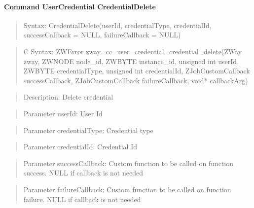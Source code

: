 \paragraph{Command UserCredential CredentialDelete}
\begin{quote}Syntax: CredentialDelete(userId, credentialType, credentialId, successCallback = NULL, failureCallback = NULL)\end{quote}
\begin{quote}C Syntax: ZWError zway\_cc\_user\_credential\_credential\_delete(ZWay zway, ZWNODE node\_id, ZWBYTE instance\_id, unsigned int userId, ZWBYTE credentialType, unsigned int credentialId, ZJobCustomCallback successCallback, ZJobCustomCallback failureCallback, void* callbackArg)\end{quote}
\begin{quote}Description: Delete credential\end{quote}
\begin{quote}Parameter userId: User Id\end{quote}
\begin{quote}Parameter credentialType: Credential type\end{quote}
\begin{quote}Parameter credentialId: Credential Id\end{quote}
\begin{quote}Parameter successCallback: Custom function to be called on function success. NULL if callback is not needed\end{quote}
\begin{quote}Parameter failureCallback: Custom function to be called on function failure. NULL if callback is not needed\end{quote}


